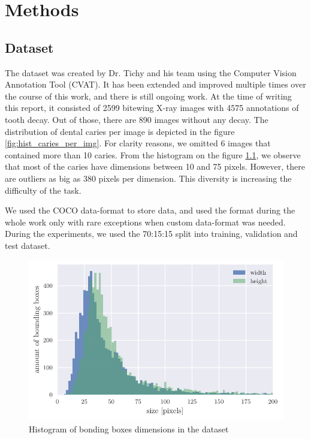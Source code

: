 \chapter{Methods}
\section{Dataset}
The dataset was created by Dr. Tichy and his team using the Computer Vision Annotation Tool (CVAT). It has been extended and improved multiple times over the course of this work, and there is still ongoing work. At the time of writing this report, it consisted of 2599 bitewing X-ray images with 4575 annotations of tooth decay. Out of those, there are 890 images without any decay. The distribution of dental caries per image is depicted in the figure \ref{fig:hist_caries_per_img}. For clarity reasons, we omitted 6 images that contained more than 10 caries. From the histogram on the figure \ref{fig:hist_caries_dim}, we observe that most of the caries have dimensions between 10 and 75 pixels. However, there are outliers as big as 380 pixels per dimension. This diversity is increasing the difficulty of the task.

We used the COCO data-format to store data, and used the format during the whole work only with rare exceptions when custom data-format was needed. During the experiments, we used the 70:15:15 split into training, validation and test dataset.
\begin{figure}
    \includegraphics[width = \linewidth]{images/dataset_histogram.pdf}
    \caption{Histogram of bonding boxes dimensions in the dataset}
    \label{fig:hist_caries_dim}
\end{figure}

